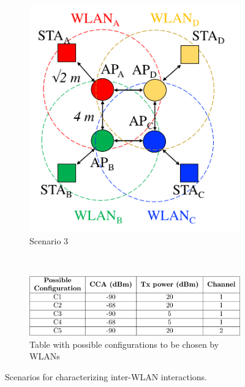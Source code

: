 \documentclass[preprint,12pt]{elsarticle}
\begin{document}
\begin{figure}[t!]
\begin{minipage}[b]{0.3\textwidth}
\begin{subfigure}[b]{\linewidth}
			\centering	
			\includegraphics[width=\textwidth]{s3_interactions}
			\caption{Scenario 3}\label{fig:s3_interactions}
		\end{subfigure}\\[\baselineskip]
	\end{minipage}
	\begin{subfigure}[b]{0.6\linewidth}
		\centering	
		\includegraphics[width=\textwidth]{table_confs}
		\caption{Table with possible configurations to be chosen by WLANs}\label{tbl:configurations}
	\end{subfigure}		
	\caption{Scenarios for characterizing inter-WLAN interactions.}
	\label{fig:scenarios_validations}
\end{figure}	
\end{document}
